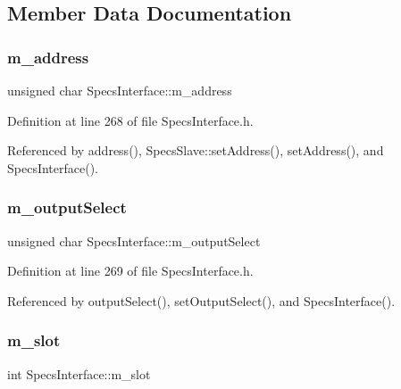 \subsection{Member Data Documentation}
\mbox{\label{classSpecsInterface_a4064da5ca6e0a172363967c4acc0b365}} 
\subsubsection{\texorpdfstring{m\+\_\+address}{m\_address}}
{\footnotesize\ttfamily unsigned char Specs\+Interface\+::m\+\_\+address\hspace{0.3cm}{\ttfamily [protected]}}



Definition at line 268 of file Specs\+Interface.\+h.



Referenced by address(), Specs\+Slave\+::set\+Address(), set\+Address(), and Specs\+Interface().

\mbox{\label{classSpecsInterface_a660cb4112ce1c071f277cb6ec115b411}} 
\subsubsection{\texorpdfstring{m\+\_\+output\+Select}{m\_outputSelect}}
{\footnotesize\ttfamily unsigned char Specs\+Interface\+::m\+\_\+output\+Select\hspace{0.3cm}{\ttfamily [protected]}}



Definition at line 269 of file Specs\+Interface.\+h.



Referenced by output\+Select(), set\+Output\+Select(), and Specs\+Interface().

\mbox{\label{classSpecsInterface_a7030d3ba54c826b3524f72e57b82ece6}} 
\subsubsection{\texorpdfstring{m\+\_\+slot}{m\_slot}}
{\footnotesize\ttfamily int Specs\+Interface\+::m\+\_\+slot\hspace{0.3cm}{\ttfamily [private]}}



